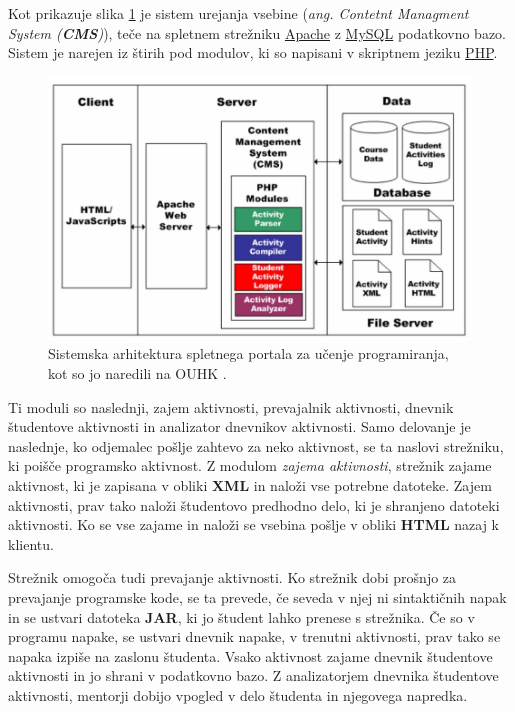 Kot prikazuje slika \ref{fig:OUHK_cmsArch} je sistem urejanja vsebine
(\emph{ang. Contetnt Managment System (\textbf{CMS})}), teče na
spletnem strežniku \href{http://www.apache.org/}{Apache} z
\href{https://www.mysql.com/}{MySQL} podatkovno bazo. Sistem je
narejen iz štirih pod modulov, ki so napisani v skriptnem jeziku
\href{http://php.net/}{PHP}.

\begin{figure}[htb!] \centering
  \includegraphics[width=0.9\linewidth, keepaspectratio =
1]{./images/SystemArch01_OUHK_DistanceEdu.jpg}
  \caption{Sistemska arhitektura spletnega portala za učenje
    programiranja, kot so jo naredili na OUHK \cite{ITaLCP_DistanceEdu}.}
  \label{fig:OUHK_cmsArch}
\end{figure}

Ti moduli so naslednji, zajem aktivnosti, prevajalnik aktivnosti,
dnevnik študentove aktivnosti in analizator dnevnikov aktivnosti. Samo
delovanje je naslednje, ko odjemalec pošlje zahtevo za neko aktivnost,
se ta naslovi strežniku, ki poišče programsko aktivnost. Z modulom
\emph{zajema aktivnosti}, strežnik zajame aktivnost, ki je zapisana v
obliki \textbf{XML} in naloži vse potrebne datoteke. Zajem aktivnosti,
prav tako naloži študentovo predhodno delo, ki je shranjeno datoteki
aktivnosti. Ko se vse zajame in naloži se vsebina pošlje v obliki
\textbf{HTML} nazaj k klientu.

Strežnik omogoča tudi prevajanje aktivnosti. Ko strežnik dobi prošnjo
za prevajanje programske kode, se ta prevede, če seveda v njej ni
sintaktičnih napak in se ustvari datoteka \textbf{JAR}, ki jo študent
lahko prenese s strežnika. Če so v programu napake, se ustvari dnevnik
napake, v trenutni aktivnosti, prav tako se napaka izpiše na zaslonu
študenta. Vsako aktivnost zajame dnevnik študentove aktivnosti in jo shrani v
podatkovno bazo. Z analizatorjem dnevnika študentove aktivnosti,
mentorji dobijo vpogled v delo študenta in njegovega napredka.

